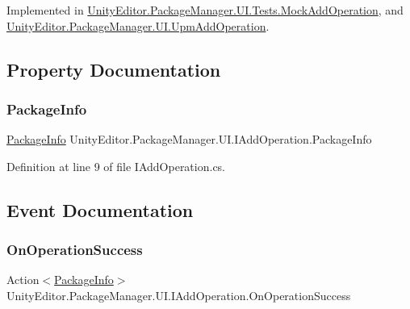 Implemented in \mbox{\hyperlink{class_unity_editor_1_1_package_manager_1_1_u_i_1_1_tests_1_1_mock_add_operation_aab0d0a956f90a3496b0a5cba30cdd2b7}{Unity\+Editor.\+Package\+Manager.\+U\+I.\+Tests.\+Mock\+Add\+Operation}}, and \mbox{\hyperlink{class_unity_editor_1_1_package_manager_1_1_u_i_1_1_upm_add_operation_ae93614e9b995f7c8fcf0456c38be1cdd}{Unity\+Editor.\+Package\+Manager.\+U\+I.\+Upm\+Add\+Operation}}.



\subsection{Property Documentation}
\mbox{\label{interface_unity_editor_1_1_package_manager_1_1_u_i_1_1_i_add_operation_a153d9a210e9b6a97954b31ad9871a833}} 
\subsubsection{\texorpdfstring{PackageInfo}{PackageInfo}}
{\footnotesize\ttfamily \mbox{\hyperlink{class_unity_editor_1_1_package_manager_1_1_u_i_1_1_package_info}{Package\+Info}} Unity\+Editor.\+Package\+Manager.\+U\+I.\+I\+Add\+Operation.\+Package\+Info\hspace{0.3cm}{\ttfamily [get]}}



Definition at line 9 of file I\+Add\+Operation.\+cs.



\subsection{Event Documentation}
\mbox{\label{interface_unity_editor_1_1_package_manager_1_1_u_i_1_1_i_add_operation_a3ccee2fcd46de2afe67149e2d82e6705}} 
\subsubsection{\texorpdfstring{OnOperationSuccess}{OnOperationSuccess}}
{\footnotesize\ttfamily Action$<$\mbox{\hyperlink{class_unity_editor_1_1_package_manager_1_1_u_i_1_1_package_info}{Package\+Info}}$>$ Unity\+Editor.\+Package\+Manager.\+U\+I.\+I\+Add\+Operation.\+On\+Operation\+Success}



